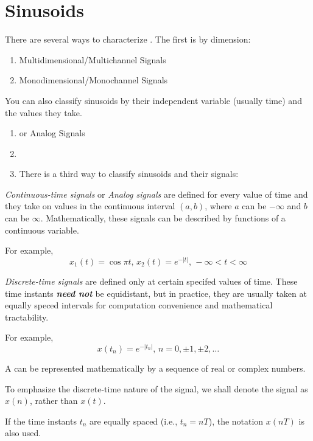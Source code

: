 \section{Sinusoids}\label{sec:Sinusoids}
There are several ways to characterize .
The first is by dimension:
\begin{enumerate}[noitemsep]
\item Multidimensional/Multichannel Signals
\item Monodimensional/Monochannel Signals
\end{enumerate}

You can also classify sinusoids by their independent variable (usually time) and the values they take.
\begin{enumerate}[noitemsep]
\item {} or Analog Signals
\item {}
\item There is a third way to classify sinusoids and their signals: 
\end{enumerate}

\begin{definition}\label{def:Continuous-Time Signals}
  \emph{Continuous-time signals} or \emph{Analog signals} are defined for every value of time and they take on values in the continuous interval $(a,b)$, where $a$ can be $-\infty$ and $b$ can be $\infty$.
  Mathematically, these signals can be described by functions of a continuous variable.

  For example,
  \begin{equation*}
    x_{1}(t) = \cos \pi t \text{, } x_{2}(t) = e^{-\lvert t \rvert} \text{, } -\infty < t < \infty
  \end{equation*}
\end{definition}

\begin{definition}\label{def:Discrete-Time Signals}
  \emph{Discrete-time signals} are defined only at certain specifed values of time.
  These time instants \textbf{\emph{need not}} be equidistant, but in practice, they are usually taken at equally speced intervals for computation convenience and mathematical tractability.

  For example,
  \begin{equation*}
    x(t_{n}) = e^{-\lvert t_{n} \rvert} \text{, } n=0, \pm 1, \pm 2, \ldots
  \end{equation*}

  A  can be represented mathematically by a sequence of real or complex numbers.
  \begin{remark}
    To emphasize the discrete-time nature of the signal, we shall denote the signal as $x(n)$, rather than $x(t)$.
  \end{remark}
  \begin{remark}
    If the time instants $t_{n}$ are equally spaced (i.e., $t_{n}=nT$), the notation $x(nT)$ is also used.
  \end{remark}
\end{definition}

